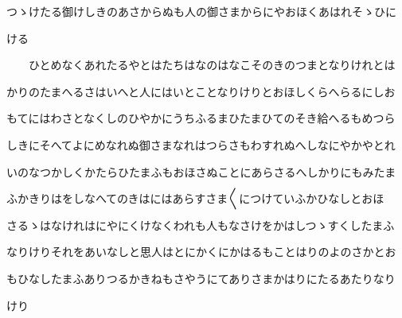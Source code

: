 \documentclass[a4paper,11pt,landscape]{ltjtarticle}
\begin{document}
\par\medskip
つゝけたる御けしきのあさからぬも人の御さまからにやおほくあはれそゝひに
\par\medskip
ける
\par\medskip
　　ひとめなくあれたるやとはたちはなのはなこそのきのつまとなりけれとは
\par\medskip
かりのたまへるさはいへと人にはいとことなりけりとおほしくらへらるにしお
\par\medskip
もてにはわさとなくしのひやかにうちふるまひたまひてのそき給へるもめつら
\par\medskip
しきにそへてよにめなれぬ御さまなれはつらさもわすれぬへしなにやかやとれ
\par\medskip
いのなつかしくかたらひたまふもおほさぬことにあらさるへしかりにもみたま
\par\medskip
ふかきりはをしなへてのきはにはあらすさま〱につけていふかひなしとおほ
\par\medskip
さるゝはなけれはにやにくけなくわれも人もなさけをかはしつゝすくしたまふ
\par\medskip
なりけりそれをあいなしと思人はとにかくにかはるもことはりのよのさかとお
\par\medskip
もひなしたまふありつるかきねもさやうにてありさまかはりにたるあたりなり
\par\medskip
けり
\par\medskip
\end{document}
